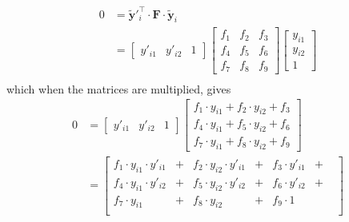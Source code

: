 \begin{equation*}
\begin{split}
0&=\mathbf{\tilde{y}}{'^\intercal_i}\cdot\mathbf{F}\cdot\mathbf{\tilde{y}}_i\\
&=\begin{bmatrix}y'_{i1} & y'_{i2} & 1\end{bmatrix}
\begin{bmatrix}f_1 & f_2 & f_3\\ f_4 & f_5 & f_6\\ f_7 & f_8 & f_9\end{bmatrix}
\begin{bmatrix}y_{i1} \\ y_{i2} \\ 1\end{bmatrix}\\
\end{split}
\end{equation*}
\noindent which when the matrices are multiplied, gives
\begin{equation*}
\begin{split}
0&=\begin{bmatrix}y'_{i1} & y'_{i2} & 1\end{bmatrix}
\begin{bmatrix}f_1\cdot y_{i1} + f_2\cdot y_{i2} + f_3\\ f_4\cdot y_{i1} + f_5\cdot y_{i2} + f_6\\ f_7\cdot y_{i1} + f_8\cdot y_{i2} + f_9\end{bmatrix}\\
&=\left[\begin{array}{ccccccc}
f_1\cdot {y_{i1}\cdot y'_{i1}} &+& %
f_2\cdot {y_{i2}\cdot y'_{i1}} &+& %
f_3\cdot {y'_{i1}} &+& \\%
f_4\cdot {y_{i1}\cdot y'_{i2}} &+& %
f_5\cdot {y_{i2}\cdot y'_{i2}} &+& %
f_6\cdot {y'_{i2}} &+& \\%
f_7\cdot {y_{i1}} &+& %
f_8\cdot {y_{i2}} &+& %
f_9\cdot {1} &\;& \\ %
\end{array}\right]\\
\end{split}
\end{equation*}
